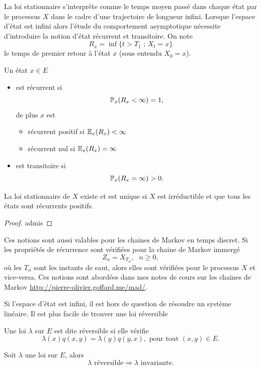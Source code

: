 La loi stationnaire s'interprête comme le temps moyen passé dans chaque état par le processus $X$ dans le cadre d'une trajectoire de longueur infini. Lorsque l'espace d'état est infini alors l'étude du comportement asymptotique nécessite d'introduire la notion d'état récurrent et transitoire. On note
$$
R_x =\inf\{t>T_1\text{ ; }X_t = x\}
$$ 
le temps de premier retour à l'état $x$ (sous entendu $X_0 = x$).
\begin{definition}\label{def:recuurent_state}
Un état $x\in E$ 
\begin{itemize}
    \item est récurrent si 
    $$
    \mathbb{P}_x(R_x<\infty) = 1, 
    $$
    de plus $x$ est 
    \begin{itemize}
        \item récurrent positif si $\mathbb{E}_x(R_x) <\infty $
        \item récurrent nul si $\mathbb{E}_x(R_x) =\infty $
    \end{itemize}
    \item est transitoire si 
    $$
    \mathbb{P}_x(R_x = \infty) > 0. 
    $$
\end{itemize}
\end{definition}
\begin{theo}
La loi stationnaire de $X$ existe et est unique si $X$ est irréductible et que tous les états sont récurrents positifs. 
\end{theo}
\begin{proof}
admis
\end{proof}
\begin{remark}
Ces notions sont aussi valables pour les chaines de Markov en temps discret. Si les propriétés de récurrence sont vérifiées pour la chaine de Markov immergé
$$
Z_n = X_{T_{n}},\text{ }n\geq 0,
$$
où les $T_n$ sont les instants de saut, alors elles sont vérifiées pour le processus $X$ et vice-versa. Ces notions sont abordées dans mes notes de cours sur les chaines de Markov \url{http://pierre-olivier.goffard.me/mad/}.
\end{remark}
Si l'espace d'état est infini, il est hors de question de résoudre un système linéaire. Il est plus facile de trouver une loi réversible
\begin{definition}
Une loi $\lambda$ sur $E$ est dite réversible si elle vérifie
$$
\lambda(x)q(x,y)= \lambda(y)q(y,x), \text{ pour tout }(x,y)\in E.
$$
\end{definition}
\begin{prop}
Soit $\lambda$ une loi sur $E$, alors 
$$
\lambda\text{ réversible}\Rightarrow \lambda\text{ invariante}.
$$
\end{prop}
